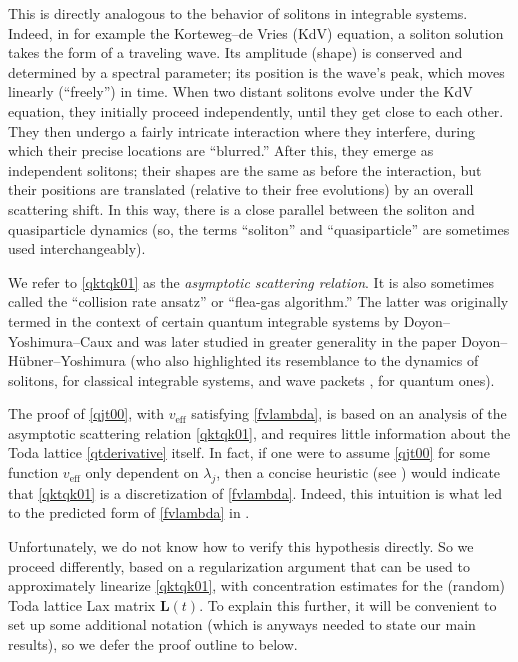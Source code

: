 \documentclass{amsart}
\numberwithin{equation}{section}
\DeclareMathOperator{\eff}{eff}
\theoremstyle{remark}
\theoremstyle{definition}
\begin{document}
	This is directly analogous to the behavior of solitons in integrable systems. Indeed, in for example the Korteweg--de Vries (KdV) equation, a soliton solution takes the form of a traveling wave. Its amplitude (shape) is conserved and determined by a spectral parameter; its position is the wave's peak, which moves linearly (``freely'') in time. When two distant solitons evolve under the KdV equation, they initially proceed independently, until they get close to each other. They then undergo a fairly intricate interaction where they interfere, during which their precise locations are ``blurred.'' After this, they emerge as independent solitons; their shapes are the same as before the interaction, but their positions are translated (relative to their free evolutions) by an overall scattering shift. In this way, there is a close parallel between the soliton and quasiparticle dynamics (so, the terms ``soliton'' and ``quasiparticle'' are sometimes used interchangeably). 

	 We refer to \eqref{qktqk01} as the \emph{asymptotic scattering relation}. It is also sometimes called the ``collision rate ansatz'' or ``flea-gas algorithm.'' The latter was originally termed in the context of certain quantum integrable systems by Doyon--Yoshimura--Caux \cite{SGGH} and was later studied in greater generality in the paper \cite{NCIS} Doyon--H\"{u}bner--Yoshimura (who also highlighted its resemblance to the dynamics of solitons, for classical integrable systems, and wave packets \cite{DGHG}, for quantum ones).
	
	The proof of \eqref{qjt00}, with $v_{\eff}$ satisfying \eqref{fvlambda}, is based on an analysis of the asymptotic scattering relation \eqref{qktqk01}, and requires little information about the Toda lattice \eqref{qtderivative} itself. In fact, if one were to assume \eqref{qjt00} for some function $v_{\eff}$ only dependent on $\lambda_j$, then a concise heuristic (see \cite[Appendix B]{LC}) would indicate that \eqref{qktqk01} is a discretization of \eqref{fvlambda}. Indeed, this intuition is what led to the predicted form of \eqref{fvlambda} in \cite{KES,TEP,EHSOE}.
	
	Unfortunately, we do not know how to verify this hypothesis directly. So we proceed differently, based on a regularization argument that can be used to approximately linearize \eqref{qktqk01}, with concentration estimates for the (random) Toda lattice Lax matrix $\bm{L}(t)$. To explain this further, it will be convenient to set up some additional notation (which is anyways needed to state our main results), so we defer the proof outline to  below.
	
\end{document}
